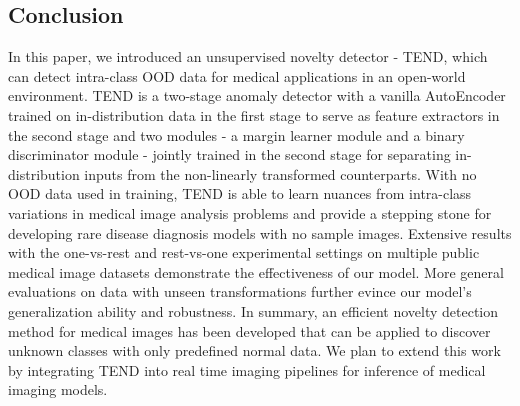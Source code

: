 \documentclass[12pt]{spieman}  %
\begin{document}
\begin{spacing}{2}
\section{Conclusion}
In this paper, we introduced an unsupervised novelty detector - TEND, which can detect intra-class OOD data for medical applications in an open-world environment. TEND is a two-stage anomaly detector with a vanilla AutoEncoder trained on in-distribution data in the first stage to serve as feature extractors in the second stage and two modules - a margin learner module and a binary discriminator module - jointly trained in the second stage for separating in-distribution inputs from the non-linearly transformed counterparts. With no OOD data used in training, TEND is able to learn nuances from intra-class variations in medical image analysis problems and provide a stepping stone for developing rare disease diagnosis models with no sample images. Extensive results with the one-vs-rest and rest-vs-one experimental settings on multiple public medical image datasets demonstrate the effectiveness of our model. More general evaluations on data with unseen transformations further evince our model's generalization ability and robustness. In summary, an efficient novelty detection method for medical images has been developed that can be applied to discover unknown classes with only predefined normal data. We plan to extend this work by integrating TEND into real time imaging pipelines for inference of medical imaging models.




\end{spacing}
\end{document}
